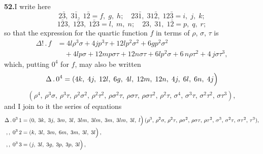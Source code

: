 \documentclass[11pt,a4paper]{article}
\theoremstyle{plain}
\theoremstyle{definition}
\theoremstyle{remark}
\begin{document}
\medskip\noindent\textbf{52.}\quad I write here
\[
2\bar{3},\;3\bar{1},\;1\bar{2} = f,\;g,\;h;\quad 23\bar{1},\;31\bar{2},\;12\bar{3} = i,\;j,\;k;
\]
\[
1\bar{2}3,\;1\bar{2}3,\;1\bar{2}3 = l,\;m,\;n;\quad 23,\;31,\;1\bar{2} = p,\;q,\;r;
\]
so that the expression for the quartic function $f$ in terms of $\rho$, $\sigma$, $\tau$ is
\begin{align*}
\Delta!\,.\,f &= 4l\rho^3\sigma + 4jp^3\tau + 12lp^2\sigma^2 + 6gp^2\sigma^2\\
&\quad + 4lp\sigma + 12mp\sigma\tau + 12n\sigma\tau + 6lp^2\sigma + 6\,n\rho\tau^2 + 4\,j\sigma\tau^3,
\end{align*}
which, putting $0^4$ for $f$, may also be written
\[
\Delta\,.\,0^4 = (4k,\;4j,\;12l,\;6g,\;4l,\;12m,\;12n,\;4j,\;6l,\;6n,\;4j\!\,\Bigl)
\]
\[
(\rho^4,\,\rho^3\sigma,\,\rho^3\tau,\,\rho^2\sigma^2,\,\rho^2\tau^2,\,\rho\sigma^2\tau,\,\rho\sigma\tau,\,\rho\sigma\tau^2,\,\rho^2\tau,\,\sigma^4,\,\sigma^3\tau,\,\sigma^2\tau^2,\,\sigma\tau^3),
\]
and I join to it the series of equations
\begin{align*}
\Delta\,.\,0^3\,1 &= (0,\;3k,\;3j,\;3m,\;3l,\;3lm,\;3lm,\;3m,\;3lm,\;3l,\;l\!\,\Bigl)\,(\rho^3,\,\rho^2\sigma,\,\rho^2\tau,\,\rho\sigma^2,\,\rho\sigma\tau,\,\rho\tau^2,\,\sigma^3,\,\sigma^2\tau,\,\sigma\tau^2,\,\tau^3),\\
,,\;0^3\,2 &= (k,\;3l,\;3m,\;6m,\;3m,\;3l,\;3l\!\,\Bigl)\, ,\\
,,\;0^3\,3 &= (j,\;3l,\;3g,\;3p,\;3p,\;3l\!\,\Bigl)\, ,
\end{align*}
\end{document}
